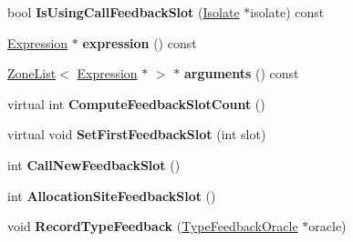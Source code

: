 \begin{DoxyCompactItemize}
\item 
\hypertarget{classv8_1_1internal_1_1_v8___f_i_n_a_l_a38b2fc43694f93facbf4f548613c137a}{}bool {\bfseries Is\+Using\+Call\+Feedback\+Slot} (\hyperlink{classv8_1_1internal_1_1_isolate}{Isolate} $\ast$isolate) const \label{classv8_1_1internal_1_1_v8___f_i_n_a_l_a38b2fc43694f93facbf4f548613c137a}

\item 
\hypertarget{classv8_1_1internal_1_1_v8___f_i_n_a_l_adc5b6319eb3831282cfa4861dc34dc4e}{}\hyperlink{classv8_1_1internal_1_1_expression}{Expression} $\ast$ {\bfseries expression} () const \label{classv8_1_1internal_1_1_v8___f_i_n_a_l_adc5b6319eb3831282cfa4861dc34dc4e}

\item 
\hypertarget{classv8_1_1internal_1_1_v8___f_i_n_a_l_ac17deb370c2cd16d555b0eecb668a5cb}{}\hyperlink{classv8_1_1internal_1_1_zone_list}{Zone\+List}$<$ \hyperlink{classv8_1_1internal_1_1_expression}{Expression} $\ast$ $>$ $\ast$ {\bfseries arguments} () const \label{classv8_1_1internal_1_1_v8___f_i_n_a_l_ac17deb370c2cd16d555b0eecb668a5cb}

\item 
\hypertarget{classv8_1_1internal_1_1_v8___f_i_n_a_l_ad227c78a22ace5712b786085f6666403}{}virtual int {\bfseries Compute\+Feedback\+Slot\+Count} ()\label{classv8_1_1internal_1_1_v8___f_i_n_a_l_ad227c78a22ace5712b786085f6666403}

\item 
\hypertarget{classv8_1_1internal_1_1_v8___f_i_n_a_l_a9d78506d71ca20df81cdbc154ce35f88}{}virtual void {\bfseries Set\+First\+Feedback\+Slot} (int slot)\label{classv8_1_1internal_1_1_v8___f_i_n_a_l_a9d78506d71ca20df81cdbc154ce35f88}

\item 
\hypertarget{classv8_1_1internal_1_1_v8___f_i_n_a_l_a7a2747c4ad13eb393ab08e1ab18f5c3b}{}int {\bfseries Call\+New\+Feedback\+Slot} ()\label{classv8_1_1internal_1_1_v8___f_i_n_a_l_a7a2747c4ad13eb393ab08e1ab18f5c3b}

\item 
\hypertarget{classv8_1_1internal_1_1_v8___f_i_n_a_l_aeec995f8b54c0745c018f73de9b19826}{}int {\bfseries Allocation\+Site\+Feedback\+Slot} ()\label{classv8_1_1internal_1_1_v8___f_i_n_a_l_aeec995f8b54c0745c018f73de9b19826}

\item 
\hypertarget{classv8_1_1internal_1_1_v8___f_i_n_a_l_a9f65b1d7803eaf70d3050b53beba0b42}{}void {\bfseries Record\+Type\+Feedback} (\hyperlink{classv8_1_1internal_1_1_type_feedback_oracle}{Type\+Feedback\+Oracle} $\ast$oracle)\label{classv8_1_1internal_1_1_v8___f_i_n_a_l_a9f65b1d7803eaf70d3050b53beba0b42}


\end{DoxyCompactItemize}
